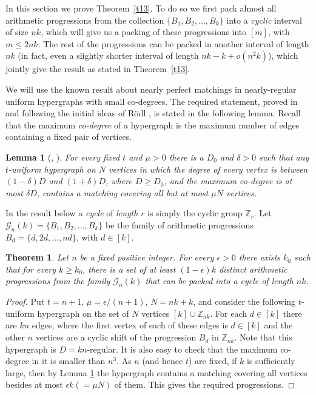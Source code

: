 \documentclass[12pt]{amsart}
\newtheorem{theorem}{Theorem}
\theoremstyle{plain}
\newtheorem{lemma}{Lemma}
\numberwithin{equation}{section}
\begin{document}
	In this section we prove Theorem~\ref{t13}.  To do so we first pack almost all arithmetic progressions from the collection $\{B_1,B_2,\ldots, B_k\}$ into a \emph{cyclic} interval of 
size $nk$, which will give us a packing of these progressions into $[m]$, with $m\leqslant 2nk$. The rest of the progressions can be packed in another interval of length $nk$ (in fact, even a 
slightly shorter interval of length $nk-k+o(n^2 k)$), which jointly give the result as stated in Theorem~\ref{t13}.

We will use the known result about nearly perfect matchings in nearly-regular uniform hypergraphs with small co-degrees. The required statement, proved  in \cite{FR} and \cite{PS} following the initial
ideas of R\"odl \cite{Ro}, is stated in the following lemma. Recall that the maximum \emph{co-degree} of a hypergraph is the maximum number of edges containing a fixed pair of vertices.
\begin{lemma}[\cite{FR}, \cite{PS}]
\label{lfr}
For every fixed $t$ and $\mu>0$ there is a $D_0$ and $\delta>0$ such that any $t$-uniform hypergraph on $N$ vertices in which the degree of every vertex is between
$(1-\delta)D$ and $(1+\delta)D$, where $D \geqslant D_0$, and the maximum co-degree is at most $\delta D$, contains a matching covering all but at most $\mu N$ vertices.
\end{lemma}
	
In the result below a \emph{cycle} of \emph{length} $r$ is simply the cyclic group $\mathbb{Z}_r$. Let $\mathcal{G}_n(k)=\{B_1,B_2,\ldots,B_k\}$ be the family of arithmetic progressions $B_d=\{d,2d,\ldots,nd\}$, with $d\in [k]$.
	
\begin{theorem}\label{t51}
Let $n$ be a fixed positive integer. For every $\epsilon>0$ there exists $k_0$ such that for every $k\geqslant k_0$, there is a set of at least $(1-\epsilon)k$ distinct arithmetic progressions from 
the family $\mathcal{G}_n(k)$ that can be packed into a cycle of length $nk$.
\end{theorem}
\begin{proof} 
	Put $t=n+1$, $\mu=\epsilon/(n+1)$, $N=nk+k$, and consider the following $t$-uniform hypergraph on the set of $N$ vertices $[k] \cup \mathbb{Z}_{nk}$. For each  $d \in [k]$ there are $kn$ edges, where the first vertex of each of these edges is $d \in [k]$ and the other $n$ vertices are a cyclic shift of the progression $B_d$ in $\mathbb{Z}_{nk}$. Note that this hypergraph is $D=kn$-regular. It is also easy to check that the maximum co-degree in it is smaller than $n^3$. As $n$ (and hence $t$) are fixed, if $k$ is sufficiently large, then by Lemma \ref{lfr} the hypergraph contains a matching covering all vertices besides at most $\epsilon k
(=\mu N)$ of them. This gives the required progressions.
\end{proof}	
\end{document}
